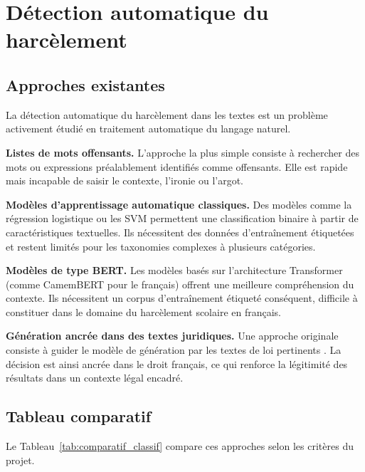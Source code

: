 \section{Détection automatique du harcèlement}

\subsection{Approches existantes}

La détection automatique du harcèlement dans les textes est un problème
activement étudié en traitement automatique du langage naturel.

\textbf{Listes de mots offensants.}
L'approche la plus simple consiste à rechercher des mots ou expressions
préalablement identifiés comme offensants.
Elle est rapide mais incapable de saisir le contexte, l'ironie ou l'argot.

\textbf{Modèles d'apprentissage automatique classiques.}
Des modèles comme la régression logistique ou les SVM permettent
une classification binaire à partir de caractéristiques textuelles.
Ils nécessitent des données d'entraînement étiquetées et restent limités
pour les taxonomies complexes à plusieurs catégories.

\textbf{Modèles de type BERT.}
Les modèles basés sur l'architecture Transformer (comme CamemBERT pour le français)
offrent une meilleure compréhension du contexte.
Ils nécessitent un corpus d'entraînement étiqueté conséquent,
difficile à constituer dans le domaine du harcèlement scolaire en français.

\textbf{Génération ancrée dans des textes juridiques.}
Une approche originale consiste à guider le modèle de génération
par les textes de loi pertinents \cite{sparkloi}.
La décision est ainsi ancrée dans le droit français,
ce qui renforce la légitimité des résultats dans un contexte légal encadré.

\subsection{Tableau comparatif}

Le Tableau~\ref{tab:comparatif_classif} compare ces approches selon les critères du projet.

